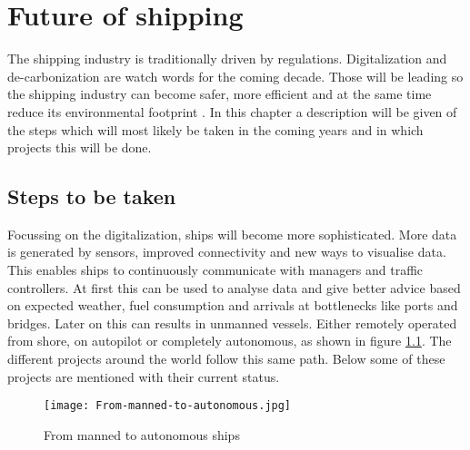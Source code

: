 \chapter{Future of shipping}
\label{sec:future}
The shipping industry is traditionally driven by regulations. Digitalization and de-carbonization are watch words for the coming decade. Those will be leading so the shipping industry can become safer, more efficient and at the same time reduce its environmental footprint \cite{Eriksen2017}. In this chapter a description will be given of the steps which will most likely be taken in the coming years and in which projects this will be done.

\section{Steps to be taken}
Focussing on the digitalization, ships will become more sophisticated. More data is generated by sensors, improved connectivity and new ways to visualise data. This enables ships to continuously communicate with managers and traffic controllers. At first this can be used to analyse data and give better advice based on expected weather, fuel consumption and arrivals at bottlenecks like ports and bridges.
Later on this can results in unmanned vessels. Either remotely operated from shore, on autopilot or completely autonomous, as shown in figure \ref{fig:From-manned-to-autonomous}. The different projects around the world follow this same path. Below some of these projects are mentioned with their current status.

\begin{figure}[hb]
	\centering
	\texttt{[image: From-manned-to-autonomous.jpg]}
	\caption{From manned to autonomous ships}
	\label{fig:From-manned-to-autonomous}
\end{figure}

